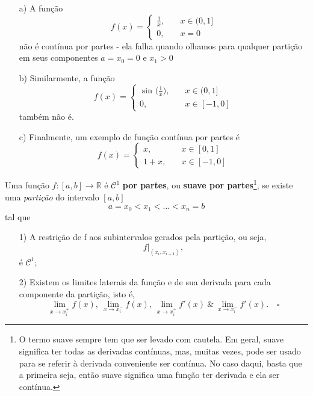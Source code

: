 \documentclass[../pde_notes.tex]{subfiles}
\begin{document}
\begin{example}
	\begin{itemize}
		\item[a)] A função
		      \[
			      f(x) = \left\{\begin{array}{ll}
				      \frac{1}{x}, & \quad x\in (0, 1] \\
				      0,           & \quad x=0
			      \end{array}\right.
		      \]
		      não é contínua por partes - ela falha quando olhamos para qualquer partição em seus componentes \(a=x_{0}=0\) e \(x_{1}>0\)
		\item[b)] Similarmente, a função
		      \[
			      f(x) = \left\{\begin{array}{ll}
				      \sin^{}{\biggl(\frac{1}{x}\biggr)}, & \quad x\in (0, 1]  \\
				      0,                                  & \quad x\in [-1, 0]
			      \end{array}\right.
		      \]
		      também não é.
		\item[c)] Finalmente, um exemplo de função contínua por partes é
		      \[
			      f(x) = \left\{\begin{array}{ll}
				      x,   & \quad x\in [0,1]   \\
				      1+x, & \quad x\in [-1, 0]
			      \end{array}\right.
		      \]
	\end{itemize}
\end{example}
\begin{def*}
	Uma função \(f:[a, b]\rightarrow \mathbb{R}\) é \(\mathcal{C}^{1}\)\textbf{ por partes}, ou \textbf{suave por partes}\footnote{O termo suave sempre tem que ser levado com cautela. Em geral, suave significa ter todas as derivadas contínuas, mas, muitas vezes, pode ser usado para se referir à derivada conveniente ser contínua. No caso daqui, basta que a primeira seja, então suave significa uma função ter derivada e ela ser contínua.}, se existe uma \textit{partição} do intervalo \([a, b]\)
	\[
		a=x_{0}<x_{1}<\dotsc <x_{n}=b
	\]
	tal que
	\begin{itemize}
		\item[1)] A restrição de f aos subintervalos gerados pela partição, ou seja,
		      \[
			      f|_{(x_{i}, x_{i+1})},
		      \]
		      é \(\mathcal{C}^{1}\);
		\item[2)] Existem os limites laterais da função e de sua derivada para cada componente da partição, isto é,
		      \[
			      \lim_{x\to x_{i}^{+}}f(x),\: \lim_{x\to x_{i}^{-}}f(x),\: \lim_{x\to x_{i}^{+}}f'(x) \:\&\: \lim_{x\to x_{i}^{-}}f'(x).\quad \square
		      \]
	\end{itemize}
\end{def*}
\end{document}
